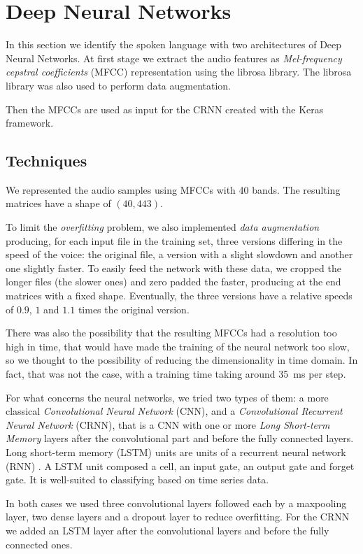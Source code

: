 \documentclass{article}
\begin{document}
\section{Deep Neural Networks}
\label{sec:dnn}
In this section we identify the spoken language with two architectures of Deep Neural Networks. At first stage we extract the audio features as \emph{Mel-frequency cepstral coefficients} (MFCC) representation using the librosa library. The librosa library was also used to perform data augmentation.
 
Then the MFCCs are used as input for the CRNN created with the Keras framework.

\subsection{Techniques}
\label{subsec:dnn-tech}
We represented the audio samples using MFCCs with 40 bands. The resulting matrices have a shape of $(40, 443)$.

To limit the \emph{overfitting} problem, we also implemented \emph{data augmentation} producing, for each input file in the training set, three versions differing in the speed of the voice: the original file, a version with a slight slowdown and another one slightly faster. To easily feed the network with these data, we cropped the longer files (the slower ones) and zero padded the faster, producing at the end matrices with a fixed shape.
Eventually, the three versions have a relative speeds of $0.9$, $1$ and $1.1$ times the original version.

There was also the possibility that the resulting MFCCs had a resolution too high in time, that would have made the training of the neural network too slow, so we thought to the possibility of reducing the dimensionality in time domain. In fact, that was not the case, with a training time taking around \SI{35}{\milli\second} per step. 

For what concerns the neural networks, we tried two types of them: a more classical \emph{Convolutional Neural Network} (CNN), and a \emph{Convolutional Recurrent Neural Network} (CRNN), that is a CNN with one or more \emph{Long Short-term Memory} layers after the convolutional part and before the fully connected layers. Long short-term memory (LSTM) units are units of a recurrent neural network (RNN) . A LSTM unit composed a cell, an input gate, an output gate and forget gate. It is well-suited to classifying based on time series data.

In both cases we used three convolutional layers followed each by a maxpooling layer, two dense layers and a dropout layer to reduce overfitting. For the CRNN we added an LSTM layer after the convolutional layers and before the fully connected ones. 
\end{document}
